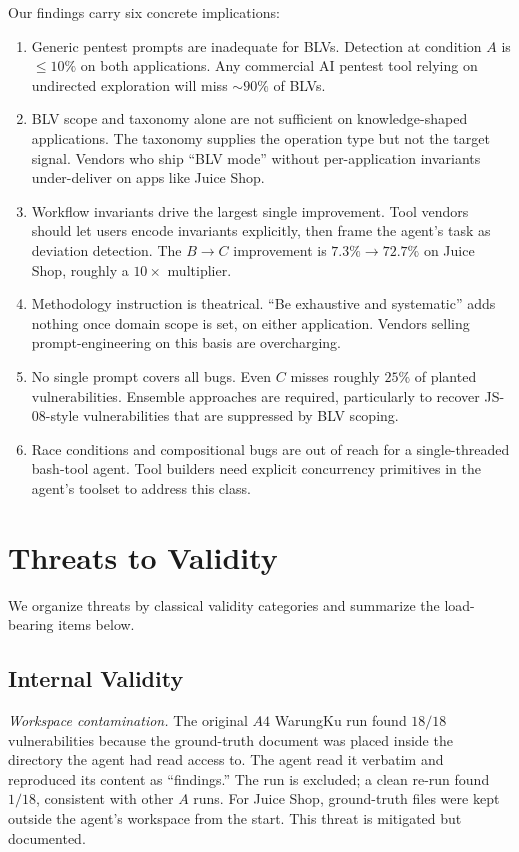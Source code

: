 \documentclass[conference]{IEEEtran}
\begin{document}
Our findings carry six concrete implications:

\begin{enumerate}
    \item Generic pentest prompts are inadequate for BLVs. Detection at condition $A$ is $\le 10\%$ on both applications. Any commercial AI pentest tool relying on undirected exploration will miss $\sim 90\%$ of BLVs.
    \item BLV scope and taxonomy alone are not sufficient on knowledge-shaped applications. The taxonomy supplies the operation type but not the target signal. Vendors who ship ``BLV mode'' without per-application invariants under-deliver on apps like Juice Shop.
    \item Workflow invariants drive the largest single improvement. Tool vendors should let users encode invariants explicitly, then frame the agent's task as deviation detection. The $B \to C$ improvement is $7.3\% \to 72.7\%$ on Juice Shop, roughly a $10\times$ multiplier.
    \item Methodology instruction is theatrical. ``Be exhaustive and systematic'' adds nothing once domain scope is set, on either application. Vendors selling prompt-engineering on this basis are overcharging.
    \item No single prompt covers all bugs. Even $C$ misses roughly $25\%$ of planted vulnerabilities. Ensemble approaches are required, particularly to recover JS-08-style vulnerabilities that are suppressed by BLV scoping.
    \item Race conditions and compositional bugs are out of reach for a single-threaded bash-tool agent. Tool builders need explicit concurrency primitives in the agent's toolset to address this class.
\end{enumerate}

\section{Threats to Validity}
\label{sec:threats}

We organize threats by classical validity categories and summarize the load-bearing items below.

\subsection{Internal Validity}

\textit{Workspace contamination.} The original $A4$ WarungKu run found $18/18$ vulnerabilities because the ground-truth document was placed inside the directory the agent had read access to. The agent read it verbatim and reproduced its content as ``findings.'' The run is excluded; a clean re-run found $1/18$, consistent with other $A$ runs. For Juice Shop, ground-truth files were kept outside the agent's workspace from the start. This threat is mitigated but documented.
\end{document}
